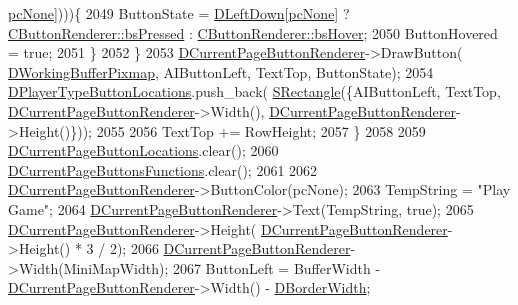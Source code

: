 \begin{DoxyCode}
      \hyperlink{GameDataTypes_8h_aafb0ca75933357ff28a6d7efbdd7602fa88767aa8e02c7b3192bbab4127b3d729}{pcNone}])))\{
2049                 ButtonState = \hyperlink{classCApplicationData_a2b943f18557c3e4c8cd4550e22e028b6}{DLeftDown}[\hyperlink{GameDataTypes_8h_aafb0ca75933357ff28a6d7efbdd7602fa88767aa8e02c7b3192bbab4127b3d729}{pcNone}] ? 
      \hyperlink{classCButtonRenderer_ae0eccda184600f6e14bfd59033e5e9a1a8fad69630f3700a97a0c51bcbb4441b5}{CButtonRenderer::bsPressed} : \hyperlink{classCButtonRenderer_ae0eccda184600f6e14bfd59033e5e9a1ad6758a415bde0eee152a0e2f7d07e3b6}{CButtonRenderer::bsHover};
2050                 ButtonHovered = \textcolor{keyword}{true};
2051             \}
2052         \}
2053         \hyperlink{classCApplicationData_abfe1743f2634b069ccc811db4a8733a8}{DCurrentPageButtonRenderer}->DrawButton(
      \hyperlink{classCApplicationData_afa34cf2780f38dd28c0c811e69d60a97}{DWorkingBufferPixmap}, AIButtonLeft, TextTop, ButtonState);
2054         \hyperlink{classCApplicationData_a49d2ad6ab469e18577716ac993b475cb}{DPlayerTypeButtonLocations}.push\_back(
      \hyperlink{structSRectangle}{SRectangle}(\{AIButtonLeft, TextTop, \hyperlink{classCApplicationData_abfe1743f2634b069ccc811db4a8733a8}{DCurrentPageButtonRenderer}->Width(),
       \hyperlink{classCApplicationData_abfe1743f2634b069ccc811db4a8733a8}{DCurrentPageButtonRenderer}->Height()\}));
2055                 
2056         TextTop += RowHeight;
2057     \}
2058     
2059     \hyperlink{classCApplicationData_a3615df8e23cea3ce17f11cf61340a7b4}{DCurrentPageButtonLocations}.clear();
2060     \hyperlink{classCApplicationData_ad3079e5563a19d21c1e4ceff2a188382}{DCurrentPageButtonsFunctions}.clear();
2061     
2062     \hyperlink{classCApplicationData_abfe1743f2634b069ccc811db4a8733a8}{DCurrentPageButtonRenderer}->ButtonColor(pcNone);
2063     TempString = \textcolor{stringliteral}{"Play Game"};
2064     \hyperlink{classCApplicationData_abfe1743f2634b069ccc811db4a8733a8}{DCurrentPageButtonRenderer}->Text(TempString, \textcolor{keyword}{true});   
2065     \hyperlink{classCApplicationData_abfe1743f2634b069ccc811db4a8733a8}{DCurrentPageButtonRenderer}->Height(
      \hyperlink{classCApplicationData_abfe1743f2634b069ccc811db4a8733a8}{DCurrentPageButtonRenderer}->Height() * 3 / 2);
2066     \hyperlink{classCApplicationData_abfe1743f2634b069ccc811db4a8733a8}{DCurrentPageButtonRenderer}->Width(MiniMapWidth);
2067     ButtonLeft = BufferWidth - \hyperlink{classCApplicationData_abfe1743f2634b069ccc811db4a8733a8}{DCurrentPageButtonRenderer}->Width() - 
      \hyperlink{classCApplicationData_a566b69c72fa982c6ecf8e47dc21df489}{DBorderWidth};

\end{DoxyCode}
